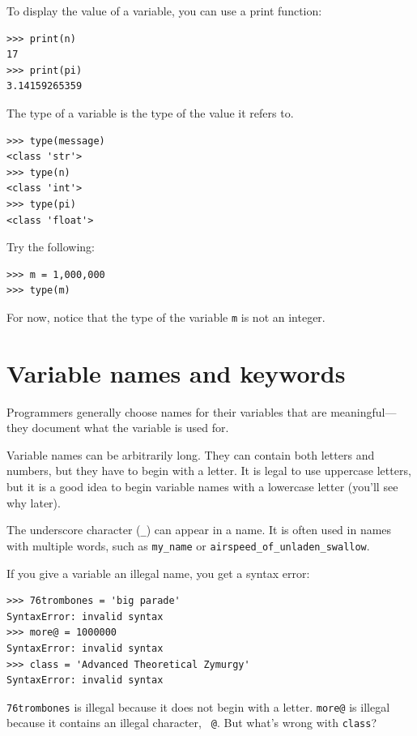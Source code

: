 \documentclass[10pt]{book}
\begin{document}
To display the value of a variable, you can use a print function:

\beforeverb
\begin{verbatim}
>>> print(n)
17
>>> print(pi)
3.14159265359
\end{verbatim}
\afterverb
%
The type of a variable is the type of the value it refers to.

\beforeverb
\begin{verbatim}
>>> type(message)
<class 'str'>
>>> type(n)
<class 'int'>
>>> type(pi)
<class 'float'>
\end{verbatim}
\afterverb
%
\begin{ex}
Try the following:

\beforeverb
\begin{verbatim}
>>> m = 1,000,000
>>> type(m)
\end{verbatim}
\afterverb

For now, notice that the type of the variable {\tt m} is not an integer.
\end{ex}




\section{Variable names and keywords}

Programmers generally choose names for their variables that
are meaningful---they document what the variable is used for.

Variable names can be arbitrarily long.  They can contain
both letters and numbers, but they have to begin with a letter.
It is legal to use uppercase letters, but it is a good idea
to begin variable names with a lowercase letter (you'll
see why later).

The underscore character (\verb"_") can appear in a name.
It is often used in names with multiple words, such as
\verb"my_name" or \verb"airspeed_of_unladen_swallow".


If you give a variable an illegal name, you get a syntax error:

\beforeverb
\begin{verbatim}
>>> 76trombones = 'big parade'
SyntaxError: invalid syntax
>>> more@ = 1000000
SyntaxError: invalid syntax
>>> class = 'Advanced Theoretical Zymurgy'
SyntaxError: invalid syntax
\end{verbatim}
\afterverb
%
{\tt 76trombones} is illegal because it does not begin with a letter.
{\tt more@} is illegal because it contains an illegal character, {\tt
@}.  But what's wrong with {\tt class}?
\end{document}
